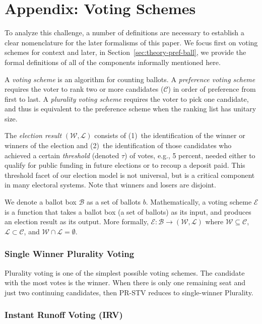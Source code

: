 \documentclass[runningheads,a4paper]{llncs}
\newcommand{\eg}{e.g.,\xspace}
\newcommand{\ballots}{\ensuremath{\mathcal{B}}\xspace}
\newcommand{\candidates}{\ensuremath{\mathcal{C}}\xspace}
\newcommand{\election}{\ensuremath{\mathcal{E}}\xspace}
\newcommand{\winners}{\ensuremath{\mathcal{W}}\xspace}
\newcommand{\losers}{\ensuremath{\mathcal{L}}\xspace}
\begin{document}
\section{Appendix: Voting Schemes}
\label{sec:methodology}

To analyze this challenge, a number of definitions are necessary to
establish a clear nomenclature for the later formalisms of this paper.
We focus first on voting schemes for context and later, in
Section~\ref{sec:theory-pref-ball}, we provide the formal definitions
of all of the components informally mentioned here.

A \emph{voting scheme} is an algorithm for counting ballots.  
A \emph{preference voting scheme} requires the voter
to rank two or more candidates (\candidates) in order of preference
from first to last.  A \emph{plurality voting scheme} requires the
voter to pick one candidate, and thus is equivalent to the preference
scheme when the ranking list has unitary size.

The \emph{election result} $(\winners, \losers)$ consists of (1)~the
identification of the winner or winners of the election and (2)~the
identification of those candidates who achieved a certain
\emph{threshold} (denoted $\tau$) of votes, \eg 5 percent, needed
either to qualify for public funding in future elections or to recoup
a deposit paid.  This threshold facet of our election model is not
universal, but is a critical component in many electoral systems.
Note that winners and losers are disjoint.

We denote a ballot box \ballots as a set of ballots $b$.
Mathematically, a voting scheme \election is a function that takes a
ballot box (a set of ballots) as its input, and produces an election
result as its output.  More formally, $\election: \ballots \rightarrow
(\winners, \losers)$ where $\winners \subseteq \candidates$, $\losers
\subset \candidates$, and $\winners \cap \losers = \emptyset$.

\subsubsection{Single Winner Plurality Voting}

Plurality voting is one of the simplest possible voting schemes.  The
candidate with the most votes is the winner.  When there is only one
remaining seat and just two continuing candidates, then PR-STV reduces
to single-winner Plurality.

\subsubsection{Instant Runoff Voting (IRV)}
\end{document}
